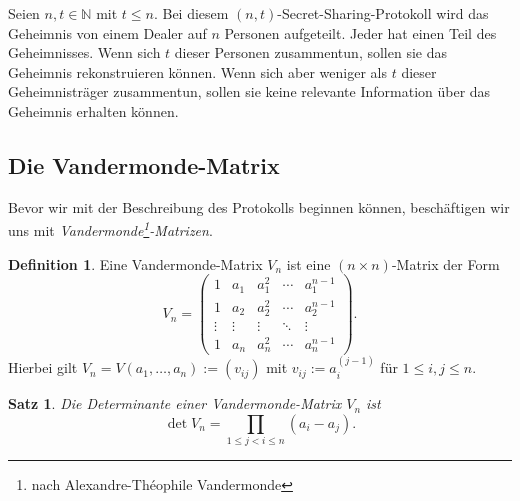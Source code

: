 \documentclass[12pt, a4paper, oneside, titlepage]{report}
\newcommand{\N}{\mathds{N}}
\newtheorem{satz}[lemma]{Satz}
\theoremstyle{definition}
\newtheorem{def1}[lemma]{Definition}
\begin{document}
	Seien $ n, t \in \N $ mit $ t \leq n $. Bei diesem $ (n,t) $-Secret-Sharing-Protokoll wird das Geheimnis von einem Dealer auf $ n $ Personen aufgeteilt. Jeder hat einen Teil des Geheimnisses. Wenn sich $ t $ dieser Personen zusammentun, sollen sie das Geheimnis rekonstruieren können. Wenn sich aber weniger als $ t $ dieser Geheimnisträger zusammentun, sollen sie keine relevante Information über das Geheimnis erhalten können. \cite{buchmann}
	
	\subsection{Die Vandermonde-Matrix}
	
	Bevor wir mit der Beschreibung des Protokolls beginnen können, beschäftigen wir uns mit \emph{Vandermonde\footnote{nach Alexandre-Théophile Vandermonde}-Matrizen}.
	
	\begin{def1}
		Eine Vandermonde-Matrix $ V_n $ ist eine $ (n \times n) $-Matrix der Form
	$$V_n =
	\begin{pmatrix}
	1 & a_1 & a_1^2 & \cdots & a_1^{n-1} \\
	1 & a_2 & a_2^2 & \cdots & a_2^{n-1} \\
	\vdots & \vdots & \vdots & \ddots & \vdots \\     
	1 & a_n & a_n^2 & \cdots & a_n^{n-1}
	\end{pmatrix}.$$
	Hierbei gilt $V_n = V(a_1, \dots, a_n) := (v_{ij}) $ mit $ v_{ij} := a_i^{(j-1)} $ für $ 1 \leq i, j \leq n$.
	\end{def1}
	\begin{satz}
		Die Determinante einer Vandermonde-Matrix $ V_n $ ist
		$$ \det V_n = \prod_{1 \leq j < i \leq n} (a_i - a_j). $$
	\end{satz}
\end{document}
